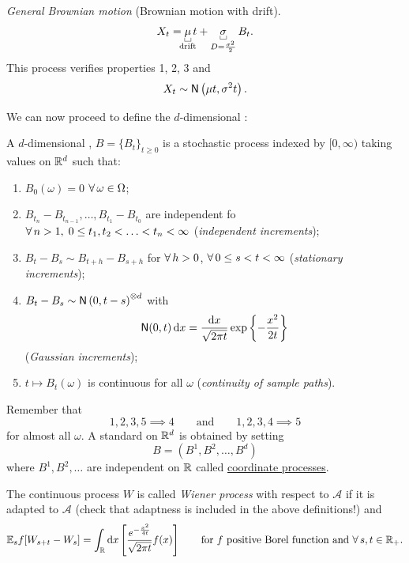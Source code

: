 \documentclass{report}
\begin{document}
\begin{definition}
	\emph{General Brownian motion} (Brownian motion with drift).\\
	\begin{equation*}
		X_{t}=\ubracketthin{\mu}_{\claptext{drift}} t+\ubracketthin{\sigma}_{D=\frac{\sigma^{2}}{2}} B_{t}.
	\end{equation*}
	This process verifies properties 1, 2, 3 and
	\begin{equation*}
		X_{t}\sim\mathsf{N}\left(\mu t,\sigma^{2}t\right).
	\end{equation*}
\end{definition}
We can now proceed to define the $d$-dimensional \bwm{}:
\begin{definition}
	A $d$-dimensional \bwm, $B={\{B_{t}\}}_{t\geq 0}$ is a stochastic process indexed by $[0,\infty)$ taking values on $\mathbb{R}^{d}$ such that:
	\begin{enumerate}
		\item $B_{0}(\omega)=0$ \as{} $\forall\,\omega\in\Omega$;
		\item $B_{t_{n}}-B_{t_{n-1}},\ldots,B_{t_{1}}-B_{t_{0}}$ are independent fo $\forall\, n>1,\;0\leq t_{1},t_{2}<\ldots<t_{n}<\infty$ (\emph{independent increments});
		\item $B_{t}-B_{s}\sim B_{t+h}-B_{s+h}$ for $\forall\, h>0$, $\forall\, 0\leq s<t<\infty$ (\emph{stationary increments});
		\item $B_{t}-B_{s}\sim\mathsf{N}\left(0,t-s\right)^{\otimes d}$ with 
		\begin{equation*}
			\mathsf{N}(0,t)\mathop{}\!\mathrm{d} x =\frac{\mathop{}\!\mathrm{d} x}{\sqrt{2\pi t}}\exp\left\{-\frac{x^{2}}{2t}\right\}
		\end{equation*} (\emph{Gaussian increments});
		\item $t\mapsto B_{t}(\omega)$ is continuous for all $\omega$ (\emph{continuity of sample paths}).
	\end{enumerate}
\end{definition}
Remember that 
\begin{equation*}
	1,2,3,5\implies 4\qquad\text{and}\qquad1,2,3,4\implies 5
\end{equation*}
for almost all $\omega$. A standard \bwm{} on $\mathbb{R}^{d}$ is obtained by setting
\begin{equation*}
	B=(B^{1},B^{2},\ldots,B^{d})
\end{equation*}
where $B^{1},B^{2},\ldots$ are independent \bwm{} on $\mathbb{R}$ called \ul{coordinate processes}.
\begin{definition}
	The continuous process $W$ is called \emph{Wiener process} with respect to $\mathscr{A}$ if it is adapted to $\mathscr{A}$ (check that adaptness is included in the above definitions!) and 
	\begin{equation*}
		\mathbb{E}_{s}f[W_{s+t}-W_{s}]=\int_{\mathbb{R}}\mathop{}\!\mathrm{d} x\left[\frac{e^{-\frac{x^{2}}{4t}}}{\sqrt{2\pi t}}f(x)\right]\qquad\text{for $f$ positive Borel function and }\forall\, s,t\in\mathbb{R}_{+}.
	\end{equation*}
\end{definition}
\end{document}

